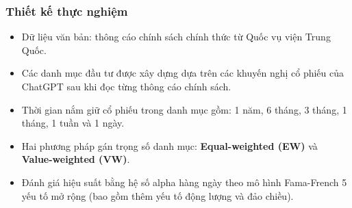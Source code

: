 \documentclass[a4paper,12pt]{article}
\begin{document}
\subsubsection{Thiết kế thực nghiệm}
\begin{itemize}
    \item Dữ liệu văn bản: thông cáo chính sách chính thức từ Quốc vụ viện Trung Quốc.
    \item Các danh mục đầu tư được xây dựng dựa trên các khuyến nghị cổ phiếu của ChatGPT sau khi đọc từng thông cáo chính sách.
    \item Thời gian nắm giữ cổ phiếu trong danh mục gồm: 1 năm, 6 tháng, 3 tháng, 1 tháng, 1 tuần và 1 ngày.
    \item Hai phương pháp gán trọng số danh mục: \textbf{Equal-weighted (EW)} và \textbf{Value-weighted (VW)}.
    \item Đánh giá hiệu suất bằng hệ số alpha hàng ngày theo mô hình Fama-French 5 yếu tố mở rộng (bao gồm thêm yếu tố động lượng và đảo chiều).
\end{itemize}
\end{document}
